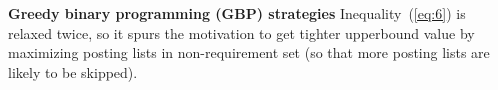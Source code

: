 \documentclass[runningheads]{llncs}
\begin{document}
\vspace{0.1in}
\noindent \textbf{Greedy binary programming (GBP) strategies}\;
% 
% 
% 
%
Inequality~(\ref{eq:6}) is relaxed twice, so it spurs the motivation to get tighter upperbound value by maximizing posting lists in non-requirement set (so that more posting lists are likely to be skipped).
\end{document}
